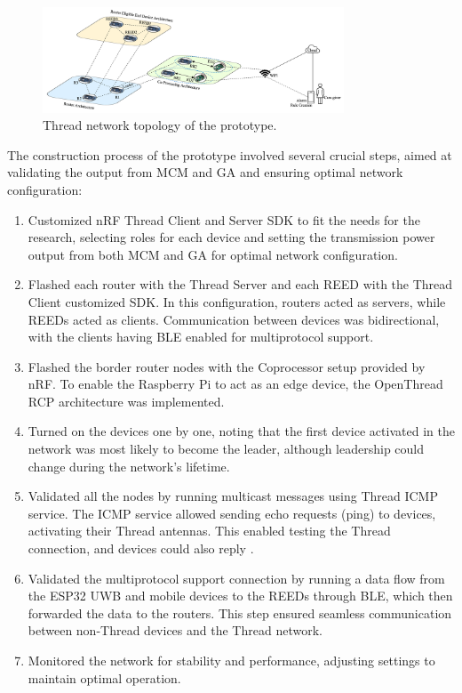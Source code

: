 \begin{figure}[H]
    \centering
    \includegraphics[width=0.8\textwidth]{images/research_design/prototype.png}
    \caption{Thread network topology of the prototype.}
    \label{fig:prototype}
\end{figure}

The construction process of the prototype involved several crucial steps, aimed at validating the output from \gls{MCM} and \gls{GA} and ensuring optimal network configuration:

\begin{enumerate}
    \item Customized \gls{nRF} Thread Client and Server \gls{SDK} to fit the needs for the research, selecting roles for each device and setting the transmission power output from both \gls{MCM} and \gls{GA} for optimal network configuration.
    \item Flashed each router with the Thread Server and each \gls{REED} with the Thread Client customized \gls{SDK}. In this configuration, routers acted as servers, while \glspl{REED} acted as clients. Communication between devices was bidirectional, with the clients having \gls{BLE} enabled for multiprotocol support.
    \item Flashed the border router nodes with the Coprocessor setup provided by \gls{nRF}. To enable the Raspberry Pi to act as an edge device, the OpenThread \gls{RCP} architecture was implemented.
    \item Turned on the devices one by one, noting that the first device activated in the network was most likely to become the leader, although leadership could change during the network's lifetime.
    \item Validated all the nodes by running multicast messages using Thread \gls{ICMP} service. The \gls{ICMP} service allowed sending echo requests (ping) to devices, activating their Thread antennas. This enabled testing the Thread connection, and devices could also reply \cite{Thread_Group_Fundamentals}.
    \item Validated the multiprotocol support connection by running a data flow from the ESP32 \gls{UWB} and mobile devices to the \glspl{REED} through \gls{BLE}, which then forwarded the data to the routers. This step ensured seamless communication between non-Thread devices and the Thread network.
    \item Monitored the network for stability and performance, adjusting settings to maintain optimal operation.
\end{enumerate}

